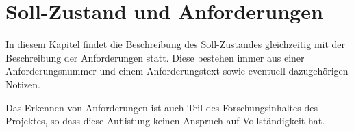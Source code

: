 \section{Soll-Zustand und Anforderungen}
In diesem Kapitel findet die Beschreibung des Soll-Zustandes gleichzeitig %
mit der Beschreibung der Anforderungen statt. Diese bestehen immer aus einer Anforderungsnummer und einem Anforderungstext sowie eventuell dazugehörigen Notizen.\par
Das Erkennen von Anforderungen ist auch Teil des Forschungsinhaltes des Projektes, so dass diese Auflistung keinen Anspruch auf Vollständigkeit hat.
